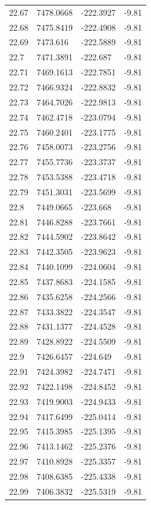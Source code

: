 \begin{table}[H]
\begin{tabular}{llll}
22.67 & 7478.0668 & -222.3927 & -9.81 \\
22.68 & 7475.8419 & -222.4908 & -9.81 \\
22.69 & 7473.616 & -222.5889 & -9.81 \\
22.7 & 7471.3891 & -222.687 & -9.81 \\
22.71 & 7469.1613 & -222.7851 & -9.81 \\
22.72 & 7466.9324 & -222.8832 & -9.81 \\
22.73 & 7464.7026 & -222.9813 & -9.81 \\
22.74 & 7462.4718 & -223.0794 & -9.81 \\
22.75 & 7460.2401 & -223.1775 & -9.81 \\
22.76 & 7458.0073 & -223.2756 & -9.81 \\
22.77 & 7455.7736 & -223.3737 & -9.81 \\
22.78 & 7453.5388 & -223.4718 & -9.81 \\
22.79 & 7451.3031 & -223.5699 & -9.81 \\
22.8 & 7449.0665 & -223.668 & -9.81 \\
22.81 & 7446.8288 & -223.7661 & -9.81 \\
22.82 & 7444.5902 & -223.8642 & -9.81 \\
22.83 & 7442.3505 & -223.9623 & -9.81 \\
22.84 & 7440.1099 & -224.0604 & -9.81 \\
22.85 & 7437.8683 & -224.1585 & -9.81 \\
22.86 & 7435.6258 & -224.2566 & -9.81 \\
22.87 & 7433.3822 & -224.3547 & -9.81 \\
22.88 & 7431.1377 & -224.4528 & -9.81 \\
22.89 & 7428.8922 & -224.5509 & -9.81 \\
22.9 & 7426.6457 & -224.649 & -9.81 \\
22.91 & 7424.3982 & -224.7471 & -9.81 \\
22.92 & 7422.1498 & -224.8452 & -9.81 \\
22.93 & 7419.9003 & -224.9433 & -9.81 \\
22.94 & 7417.6499 & -225.0414 & -9.81 \\
22.95 & 7415.3985 & -225.1395 & -9.81 \\
22.96 & 7413.1462 & -225.2376 & -9.81 \\
22.97 & 7410.8928 & -225.3357 & -9.81 \\
22.98 & 7408.6385 & -225.4338 & -9.81 \\
22.99 & 7406.3832 & -225.5319 & -9.81 \\

\end{tabular}
\end{table}
